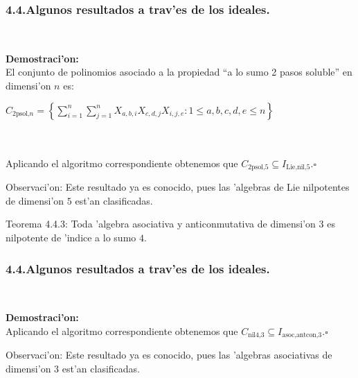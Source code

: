 \documentclass[10pt]{beamer}
\begin{document}
\begin{frame}
\frametitle{4.4.Algunos resultados a trav'es de los ideales.}\\
\begin{block}{}
\textbf{Demostraci'on:}\\
El conjunto de polinomios asociado a la propiedad ``a lo sumo 2 pasos soluble'' en dimensi'on $n$ es:\\
\begin{center}
$C_{\text{2psol,}n}= \displaystyle \left \{\sum_{i=1}^{n}\sum_{j=1}^n X_{a,b,i} X_{c,d,j} X_{i,j,e}:1\leq a,b,c,d,e \leq n \right \}$\\\\
\end{center}
\\
Aplicando el algoritmo correspondiente obtenemos que $C_{\text{2psol,}5} \subseteq I_{\text{Lie,nil,}5}$.\hfill $\square$\\
\end{block}
\begin{block}{Observaci'on:}
Este resultado ya es conocido, pues las 'algebras de Lie nilpotentes de dimensi'on $5$ est'an clasificadas.\\
\end{block}
\begin{block}{Teorema 4.4.3:}
Toda 'algebra asociativa y anticonmutativa de dimensi'on $3$ es nilpotente de 'indice a lo sumo $4$.\\ 
\end{block}
\end{frame}


\begin{frame}
\frametitle{4.4.Algunos resultados a trav'es de los ideales.}\\
\begin{block}{}
\textbf{Demostraci'on:}\\
Aplicando el algoritmo correspondiente obtenemos que $C_{\text{nil4,}3} \subseteq I_{\text{asoc,antcon,}3}$.\hfill $\square$\\
\end{block}
\begin{block}{Observaci'on:}
Este resultado ya es conocido, pues las 'algebras asociativas de dimensi'on $3$ est'an clasificadas.\\
\end{block}
\vspace{6cm}
\end{frame}
\end{document}
